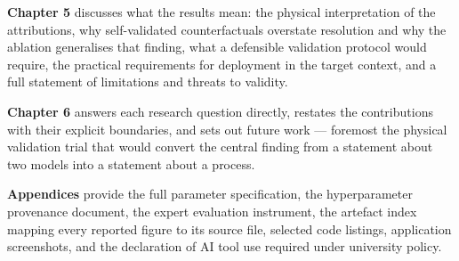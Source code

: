 \textbf{Chapter 5} discusses what the results mean: the physical interpretation of the attributions, why self-validated counterfactuals overstate resolution and why the ablation generalises that finding, what a defensible validation protocol would require, the practical requirements for deployment in the target context, and a full statement of limitations and threats to validity.

\textbf{Chapter 6} answers each research question directly, restates the contributions with their explicit boundaries, and sets out future work --- foremost the physical validation trial that would convert the central finding from a statement about two models into a statement about a process.

\textbf{Appendices} provide the full parameter specification, the hyperparameter provenance document, the expert evaluation instrument, the artefact index mapping every reported figure to its source file, selected code listings, application screenshots, and the declaration of AI tool use required under university policy.
